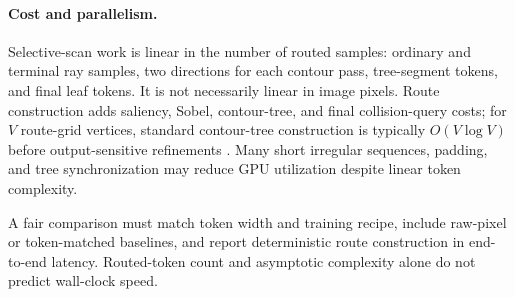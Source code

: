 \paragraph{Cost and parallelism.}
Selective-scan work is linear in the number of routed samples: ordinary and terminal ray samples, two directions for each contour pass, tree-segment tokens, and final leaf tokens. It is not necessarily linear in image pixels. Route construction adds saliency, Sobel, contour-tree, and final collision-query costs; for $V$ route-grid vertices, standard contour-tree construction is typically $O(V\log V)$ before output-sensitive refinements \cite{carr2003contourtrees}. Many short irregular sequences, padding, and tree synchronization may reduce GPU utilization despite linear token complexity.

A fair comparison must match token width and training recipe, include raw-pixel or token-matched baselines, and report deterministic route construction in end-to-end latency. Routed-token count and asymptotic complexity alone do not predict wall-clock speed.
